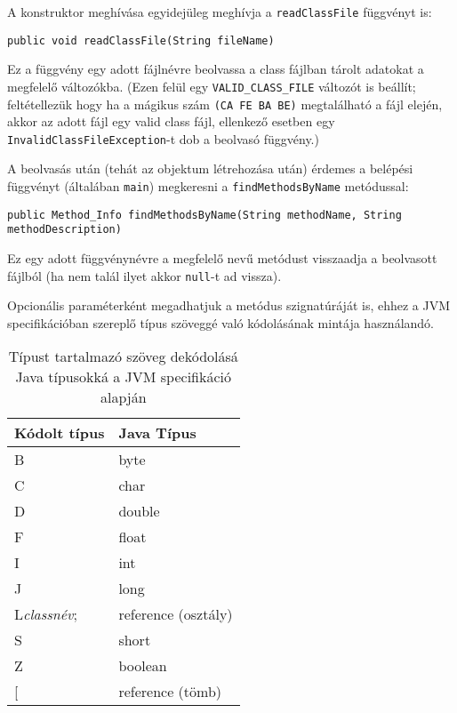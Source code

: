A konstruktor meghívása egyidejüleg meghívja a \lstinline{readClassFile} függvényt is:
\begin{verbatim}
public void readClassFile(String fileName)
\end{verbatim}
Ez a függvény egy adott fájlnévre beolvassa a class fájlban tárolt adatokat a megfelelő változókba.
(Ezen felül egy \lstinline{VALID_CLASS_FILE} változót is beállít; feltétellezük hogy ha a mágikus szám \lstinline{(CA FE BA BE)} megtalálható a fájl elején, akkor az adott fájl egy valid class fájl, ellenkező esetben egy \lstinline{InvalidClassFileException}-t dob a beolvasó függvény.)

A beolvasás után (tehát az objektum létrehozása után) érdemes a belépési függvényt (általában \lstinline{main}) megkeresni a \lstinline{findMethodsByName} metódussal:
\begin{verbatim}
public Method_Info findMethodsByName(String methodName, String methodDescription)
\end{verbatim}
Ez egy adott függvénynévre a megfelelő nevű metódust visszaadja a beolvasott fájlból (ha nem talál ilyet akkor \lstinline{null}-t ad vissza). 

Opcionális paraméterként megadhatjuk a metódus szignatúráját is, ehhez a JVM specifikációban szereplő típus szöveggé való kódolásának mintája használandó.
\begin{table}[H]
	\centering
	\begin{tabular}{ | m{} | m{} | }
		\hline
		\textbf{Kódolt típus} & \textbf{Java Típus} \\
		\hline \hline
		B & byte \\
		\hline
		C & char \\
		\hline
		D & double \\
		\hline
		F & float \\
		\hline
		I & int \\
		\hline
		J & long \\
		\hline
		L\textit{classnév}; & reference (osztály) \\
		\hline
		S & short \\
		\hline
		Z & boolean \\
		\hline
		{[} & reference (tömb) \\
		\hline
	\end{tabular}
	\caption{Típust tartalmazó szöveg dekódolásá Java típusokká a JVM specifikáció alapján}
	\label{tab:jvmtypeencoding}
\end{table}

